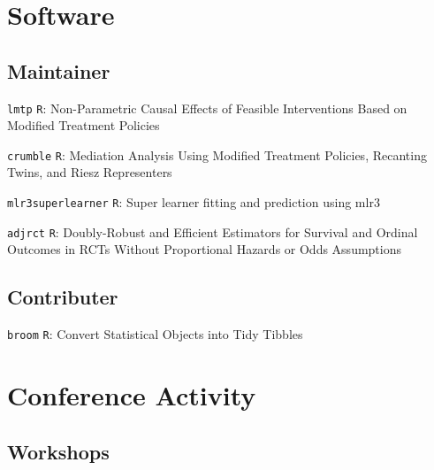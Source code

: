\documentclass[12pt,letterpaper]{report}
\begin{document}
    \section*{Software}
    
    \subsection*{Maintainer}
    
    \begin{tablist}
    
    	\item[{\footnotesize \texttt{lmtp}}] \tab \texttt{R}: Non-Parametric Causal Effects of Feasible Interventions Based on Modified Treatment Policies
	
	    	\item[{\footnotesize \texttt{crumble}}] \tab \texttt{R}: Mediation Analysis Using Modified Treatment Policies, Recanting Twins, and Riesz Representers
		
		\item[{\footnotesize \texttt{mlr3superlearner}}] \tab \texttt{R}: Super learner fitting and prediction using mlr3
		
		\item[{\footnotesize \texttt{adjrct}}] \tab \texttt{R}: Doubly-Robust and Efficient Estimators for Survival and Ordinal Outcomes in RCTs Without Proportional Hazards or Odds Assumptions
    
    \end{tablist}
    
    \subsection*{Contributer}
    
    \begin{tablist}
    
    	\item[{\footnotesize \texttt{broom}}] \tab \texttt{R}: Convert Statistical Objects into Tidy Tibbles
    
    \end{tablist}

    \section*{Conference Activity}
    
    \subsection*{Workshops}
    
\end{document}
